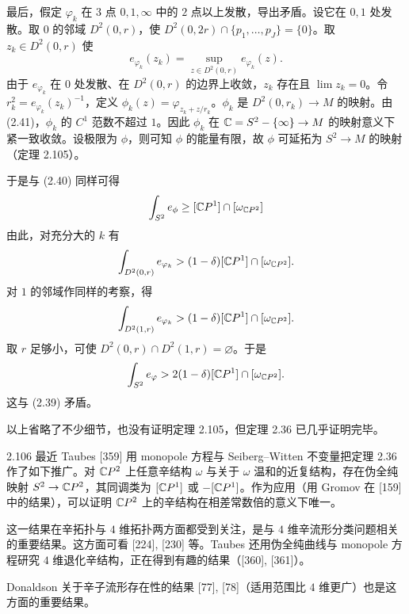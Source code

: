 最后，假定 $\varphi_k$ 在 $3$ 点 $0,1,\infty$ 中的 $2$ 点以上发散，导出矛盾。设它在 $0,1$ 处发散。取 $0$ 的邻域 $D^2(0,r)$，使 $D^2(0,2r)\cap\{p_1,\dots,p_J\}=\{0\}$。取 $z_k\in D^2(0,r)$ 使
\begin{equation}
  e_{\varphi_k}(z_k)=\sup_{z\in D^2(0,r)}e_{\varphi_k}(z). \tag{2.41}
\end{equation}
由于 $e_{\varphi_k}$ 在 $0$ 处发散、在 $D^2(0,r)$ 的边界上收敛，$z_k$ 存在且 $\lim z_k=0$。令 $r_k^2=e_{\varphi_k}(z_k)^{-1}$，定义 $\phi_k(z)=\varphi_{z_k+z/r_k}$。$\phi_k$ 是 $D^2(0,r_k)\to M$ 的映射。由 (2.41)，$\phi_k$ 的 $C^1$ 范数不超过 $1$。因此 $\phi_k$ 在 $\mathbb{C}=S^2-\{\infty\}\to M$ 的映射意义下紧一致收敛。设极限为 $\phi$，则可知 $\phi$ 的能量有限，故 $\phi$ 可延拓为 $S^2\to M$ 的映射（定理 2.105）。

于是与 (2.40) 同样可得
\[
  \int_{S^2}e_\phi\ge[\mathbb{C} P^1]\cap[\omega_{\mathbb{C} P^2}]
\]
由此，对充分大的 $k$ 有
\[
  \int_{D^2(0,r)}e_{\varphi_k}>(1-\delta)[\mathbb{C} P^1]\cap[\omega_{\mathbb{C} P^2}].
\]
对 $1$ 的邻域作同样的考察，得
\[
  \int_{D^2(1,r)}e_{\varphi_k}>(1-\delta)[\mathbb{C} P^1]\cap[\omega_{\mathbb{C} P^2}].
\]
取 $r$ 足够小，可使 $D^2(0,r)\cap D^2(1,r)=\varnothing$。于是
\[
  \int_{S^2}e_\varphi>2(1-\delta)[\mathbb{C} P^1]\cap[\omega_{\mathbb{C} P^2}].
\]
这与 (2.39) 矛盾。



以上省略了不少细节，也没有证明定理 2.105，但定理 2.36 已几乎证明完毕。

\begin{remark}{2.106}
  最近 Taubes [359] 用 monopole 方程与 Seiberg–Witten 不变量把定理 2.36 作了如下推广。对 $\mathbb{C} P^2$ 上任意辛结构 $\omega$ 与关于 $\omega$ 温和的近复结构，存在伪全纯映射 $S^2\to\mathbb{C} P^2$，其同调类为 $[\mathbb{C} P^1]$ 或 $-[\mathbb{C} P^1]$。作为应用（用 Gromov 在 [159] 中的结果），可以证明 $\mathbb{C} P^2$ 上的辛结构在相差常数倍的意义下唯一。

  这一结果在辛拓扑与 $4$ 维拓扑两方面都受到关注，是与 $4$ 维辛流形分类问题相关的重要结果。这方面可看 [224], [230] 等。Taubes 还用伪全纯曲线与 monopole 方程研究 $4$ 维退化辛结构，正在得到有趣的结果（[360], [361]）。

  Donaldson 关于辛子流形存在性的结果 [77], [78]（适用范围比 $4$ 维更广）也是这方面的重要结果。
\end{remark}

